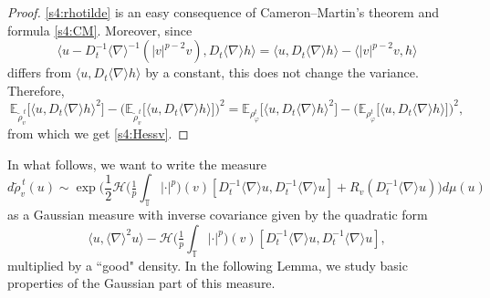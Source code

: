 \documentclass[letterpaper, 11pt,  reqno]{amsart}
\theoremstyle{definition}
\newcommand{\1}{\mathbbm 1}
\newcommand{\T}{\mathbb{T}}
\newcommand{\0}{\mathbf 0}
\newcommand{\E}{\mathbb{E}}
\newcommand{\nb}{\nabla}
\newcommand{\jb}[1]
{\langle #1 \rangle}
\newcommand{\ind}{\mathbbm 1}
\newcommand{\ph}{\varphi}
\numberwithin{equation}{section}
\numberwithin{theorem}{section}
\newcommand{\WW}[1]{e^{\frac1p\int_\T|D_t^{-1}\jb\nb u+#1|^p\,dx}\,\ind_{\{\|D_t^{-1}\jb\nb u+#1\|_{L^2}^2\le K\}}}
\newcommand{\HF}[2]{\mathcal H\big(\tfrac1p{\textstyle\int_\T}|\cdot|^p\big)(#1)[#2]}
\newcommand{\WV}[1]{e^{\frac1p\int_\T|#1+D_t^{-1}\jb\nb u|^p-\frac1p\int_\T|#1|^p-\langle D_t^{-1}\jb\nb u,\,|#1|^{p-2}#1\rangle}\,\ind_{\{\|#1+D_t^{-1}\jb\nb u\|_{L^2}^2\le K\}}}
\begin{document}
\begin{proof}
\eqref{s4:rhotilde} is an easy consequence of Cameron--Martin's theorem and formula \eqref{s4:CM}.  
Moreover, since
\[
\big\langle u-D_t^{-1}\jb\nb^{-1}(|v|^{p-2}v),D_t\jb\nb h\big\rangle=\jb{u,D_t\jb\nb h}-\big\langle|v|^{p-2}v,h\big\rangle
\]
differs from $\jb{u,D_t\jb\nb h}$ by a constant, this does not change the variance. Therefore, 
$$ \E_{\tilde\rho^{\,t}_v}\big[\jb{u,D_t\jb\nb h}^2\big]-\Big(\E_{\tilde\rho^{\,t}_v}\big[\jb{u,D_t\jb\nb h}\big]\Big)^2 = \E_{\rho^t_\ph}\Big[\big\langle u,D_t\jb\nb h\big\rangle^2\Big]
-\Big(\E_{\rho^t_\ph}\Big[\big\langle u,D_t\jb\nb h\big\rangle\Big]\Big)^2,$$
from which we get \eqref{s4:Hessv}.
\end{proof}
 In what follows, we want to write the measure 
 $$ d\tilde\rho^{\,t}_v(u) \sim \exp\Big(\frac12\HF{v}{D_t^{-1}\jb\nb u,D_t^{-1}\jb\nb u}+R_v(D_t^{-1}\jb\nb u)\Big) d \mu(u)$$
as a Gaussian measure with inverse covariance given by the quadratic form
$$ \jb{u,\jb\nb^2u}-\HF{v}{D_t^{-1}\jb\nb u,D_t^{-1}\jb\nb u},$$
multiplied by a ``good" density. In the following Lemma, we study basic properties of the Gaussian part of this measure. 
 
\end{document}
